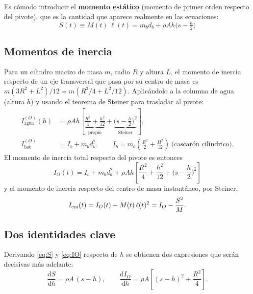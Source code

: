 \documentclass[11pt,a4paper]{article}
\newcommand{\dd}{\mathrm{d}}
\begin{document}
Es cómodo introducir el \textbf{momento estático} (momento de primer orden respecto del pivote),
que es la cantidad que aparece realmente en las ecuaciones:
\begin{equation}
\boxed{\;S(t) \equiv M(t)\,\ell(t) = m_b d_b + \rho A h\Big(s-\tfrac h2\Big)\;}
\label{eq:S}
\end{equation}

\subsection{Momentos de inercia}

Para un cilindro macizo de masa $m$, radio $R$ y altura $L$, el momento de inercia respecto de un
eje transversal que pasa por su centro de masa es $m(3R^2+L^2)/12 = m(R^2/4 + L^2/12)$. Aplicándolo
a la columna de agua (altura $h$) y usando el teorema de Steiner para trasladar al pivote:
\begin{align}
I_{\text{agua}}^{(O)}(h) &= \rho A h\left[\underbrace{\frac{R^2}{4}+\frac{h^2}{12}}_{\text{propio}}
   + \underbrace{\Big(s-\frac h2\Big)^{\!2}}_{\text{Steiner}}\right], \\[2mm]
I_{\text{bot}}^{(O)} &= I_b + m_b d_b^2 , \qquad
I_b = m_b\left(\frac{R^2}{2}+\frac{H^2}{12}\right)\ \text{(cascarón cilíndrico)} .
\end{align}
El momento de inercia total respecto del pivote es entonces
\begin{equation}
\boxed{\;
I_O(t) = I_b + m_b d_b^2 + \rho A h\left[\frac{R^2}{4}+\frac{h^2}{12}+\Big(s-\frac h2\Big)^{\!2}\right]
\;}
\label{eq:IO}
\end{equation}
y el momento de inercia respecto del centro de masa instantáneo, por Steiner,
\begin{equation}
I_{\rm cm}(t) = I_O(t) - M(t)\,\ell(t)^2 = I_O - \frac{S^2}{M}.
\label{eq:Icm}
\end{equation}

\subsection{Dos identidades clave}
\label{sec:identidades}

Derivando \eqref{eq:S} y \eqref{eq:IO} respecto de $h$ se obtienen dos expresiones que serán
decisivas más adelante:
\begin{equation}
\boxed{\;\frac{\dd S}{\dd h}=\rho A\,(s-h),\qquad
        \frac{\dd I_O}{\dd h}=\rho A\left[(s-h)^2+\frac{R^2}{4}\right].\;}
\label{eq:identidades}
\end{equation}
\end{document}
